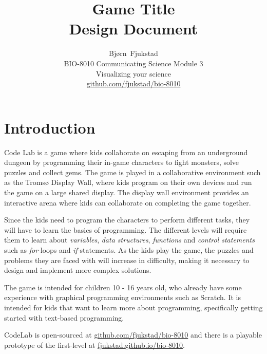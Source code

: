 \documentclass[12pt,journal,compsoc]{IEEEtran}
\begin{document}
\title{Game Title \\ Design Document}

\author{Bjørn~Fjukstad \\ BIO-8010 Communicating Science Module 3\\ Visualizing
your science \\ \url{github.com/fjukstad/bio-8010}} 

\maketitle
\vspace{-15mm}

\section{Introduction} 
Code Lab is a game where kids collaborate on escaping from an underground
dungeon by programming their in-game characters to fight monsters, solve puzzles
and collect gems. The game is played in a collaborative environment such as the
Tromsø Display Wall\cite{anshus2013nineyears}, where kids program on their own
devices and run the game on a large shared display. The display wall environment
provides an interactive arena where kids can collaborate on completing the game
together.

Since the kids need to program the characters to perform different tasks, they
will have to learn the basics of programming. The different levels will require
them to learn about \emph{variables}, \emph{data structures}, \emph{functions}
and \emph{control statements} such as \emph{for}-loops and \emph{if}-statements. 
As the kids play the game, the puzzles and problems they are faced with will
increase in difficulty, making it necessary to design and implement more
complex solutions. 

The game is intended for children 10 - 16 years old, who already have some
experience with graphical programming environments such as
Scratch\cite{resnick2009scratch}. It is intended for kids that want to learn
more about programming, specifically getting started with text-based
programming. 

CodeLab is open-sourced at \url{github.com/fjukstad/bio-8010} and there is a
playable prototype of the first-level at \url{fjukstad.github.io/bio-8010}. 

\end{document}
